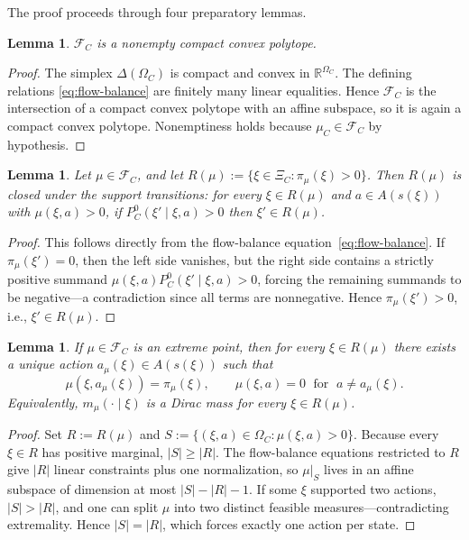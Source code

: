 \documentclass[12pt,a4paper]{article}
\newtheorem{lemma}[theorem]{Lemma}
\theoremstyle{definition}
\newcommand{\R}{\mathbb{R}}
\begin{document}
The proof proceeds through four preparatory lemmas.

\begin{lemma}\label{lem:polytope}
$\mathcal{F}_C$ is a nonempty compact convex polytope.
\end{lemma}

\begin{proof}
The simplex $\Delta(\Omega_C)$ is compact and convex in $\R^{\Omega_C}$. The defining relations \eqref{eq:flow-balance} are finitely many linear equalities. Hence $\mathcal{F}_C$ is the intersection of a compact convex polytope with an affine subspace, so it is again a compact convex polytope. Nonemptiness holds because $\mu_C \in \mathcal{F}_C$ by hypothesis.
\end{proof}

\begin{lemma}\label{lem:support-closed}
Let $\mu \in \mathcal{F}_C$, and let $R(\mu) := \{\xi \in \Xi_C : \pi_\mu(\xi) > 0\}$. Then $R(\mu)$ is closed under the support transitions: for every $\xi \in R(\mu)$ and $a \in A(s(\xi))$ with $\mu(\xi, a) > 0$, if $P_C^0(\xi' \mid \xi, a) > 0$ then $\xi' \in R(\mu)$.
\end{lemma}

\begin{proof}
This follows directly from the flow-balance equation~\eqref{eq:flow-balance}. If $\pi_\mu(\xi') = 0$, then the left side vanishes, but the right side contains a strictly positive summand $\mu(\xi, a) P_C^0(\xi' \mid \xi, a) > 0$, forcing the remaining summands to be negative---a contradiction since all terms are nonneg\-ative. Hence $\pi_\mu(\xi') > 0$, i.e., $\xi' \in R(\mu)$.
\end{proof}

\begin{lemma}\label{lem:extreme-deterministic}
If $\mu \in \mathcal{F}_C$ is an extreme point, then for every $\xi \in R(\mu)$ there exists a unique action $a_\mu(\xi) \in A(s(\xi))$ such that
\[
\mu(\xi, a_\mu(\xi)) = \pi_\mu(\xi), \qquad \mu(\xi, a) = 0 \;\text{ for }\; a \neq a_\mu(\xi).
\]
Equivalently, $m_\mu(\cdot \mid \xi)$ is a Dirac mass for every $\xi \in R(\mu)$.
\end{lemma}

\begin{proof}
Set $R := R(\mu)$ and $S := \{(\xi, a) \in \Omega_C : \mu(\xi, a) > 0\}$. Because every $\xi \in R$ has positive marginal, $|S| \geq |R|$. The flow-balance equations restricted to $R$ give $|R|$ linear constraints plus one normalization, so $\mu|_S$ lives in an affine subspace of dimension at most $|S| - |R| - 1$. If some $\xi$ supported two actions, $|S| > |R|$, and one can split $\mu$ into two distinct feasible measures---contradicting extremality. Hence $|S| = |R|$, which forces exactly one action per state.
\end{proof}
\end{document}
